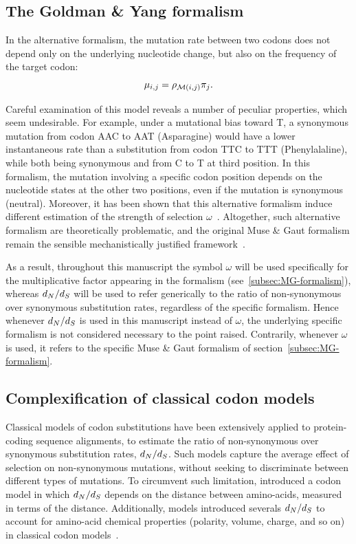 \subsection{The Goldman \& Yang formalism}
\label{subsec:GY-formalism}

In the alternative \citet{Goldman1994} formalism, the mutation rate between two codons does not depend only on the underlying nucleotide change, but also on the frequency of the target codon:
\begin{equation}
    \mu_{{i}, {j}} = \rho_{\mathcal{M}({i}, {j})} \pi_{{j}}.
\end{equation}

Careful examination of this model reveals a number of peculiar properties, which seem undesirable.
For example, under a mutational bias toward T, a synonymous mutation from codon AAC to AAT (Asparagine) would have a lower instantaneous rate than a substitution from codon TTC to TTT (Phenylalaline), while both being synonymous and from C to T at third position.
In this formalism, the mutation involving a specific codon position depends on the nucleotide states at the other two positions, even if the mutation is synonymous (neutral).
Moreover, it has been shown that this alternative formalism induce different estimation of the strength of selection $\omega$~\citep{Pond2005a,Yap2010, Spielman2015}.
Altogether, such alternative formalism are theoretically problematic, and the original Muse \& Gaut formalism remain the sensible mechanistically justified framework~\citep{Rodrigue2008a}.

As a result, throughout this manuscript the symbol $\omega$ will be used specifically for the multiplicative factor appearing in the \citet{Muse1994} formalism (see~\ref{subsec:MG-formalism}), whereas $d_N / d_S$ will be used to refer generically to the ratio of non-synonymous over synonymous substitution rates, regardless of the specific formalism.
Hence whenever $d_N / d_S$ is used in this manuscript instead of $\omega$, the underlying specific formalism is not considered necessary to the point raised.
Contrarily, whenever $\omega$ is used, it refers to the specific Muse \& Gaut formalism of section~\ref{subsec:MG-formalism}.

\subsection{Complexification of classical codon models}
\label{subsec:classical-codon-models-complexification}

Classical models of codon substitutions have been extensively applied to protein-coding sequence alignments, to estimate the ratio of non-synonymous over synonymous substitution rates, $d_N / d_S$.
Such models capture the average effect of selection on non-synonymous mutations, without seeking to discriminate between different types of mutations.
To circumvent such limitation, \citet{Yang1998a} introduced a codon model in which $d_N / d_S$ depends on the distance between amino-acids, measured in terms of the \citet{Grantham1974} distance.
Additionally, models introduced severals $d_N / d_S$ to account for amino-acid chemical properties (polarity, volume, charge, and so on) in classical codon models~\citep{Dutheil2008}.

